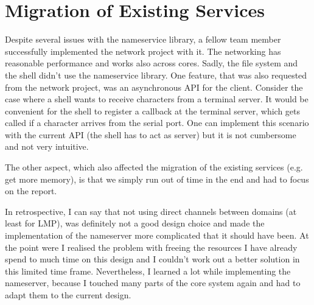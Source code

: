 \section{Migration of Existing Services}

Despite several issues with the nameservice library, a fellow team member successfully implemented the network project with it. The
networking has reasonable performance and works also across cores. Sadly, the file system and the shell didn't use the nameservice
library. One feature, that was also requested from the network project, was an asynchronous API for the client. Consider the case
where a shell wants to receive characters from a terminal server. It would be convenient for the shell to register a callback at
the terminal server, which gets called if a character arrives from the serial port. One can implement this scenario with the current
API (the shell has to act as server) but it is not cumbersome and not very intuitive.

The other aspect, which also affected the migration of the existing services (e.g. get more memory), is that we simply run out of
time in the end and had to focus on the report.

In retrospective, I can say that not using direct channels between domains (at least for LMP), was definitely not a good design choice and
made the implementation of the nameserver more complicated that it should have been. At the point were I realised the problem with freeing
the resources I have already spend to much time on this design and I couldn't work out a better solution in this limited time frame. 
Nevertheless, I learned a lot while implementing the nameserver, because I touched many parts of the core system again and had to adapt them
to the current design.

